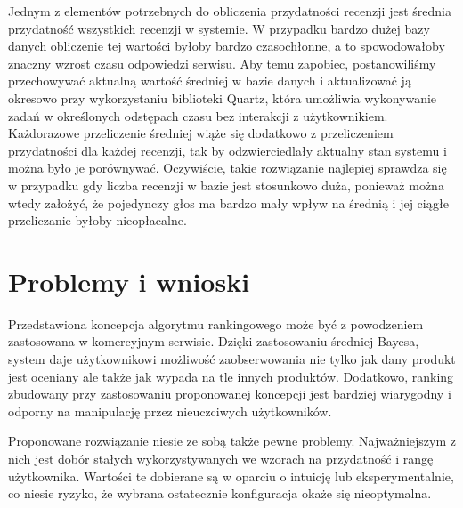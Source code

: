 Jednym z elementów potrzebnych do obliczenia przydatności recenzji jest średnia przydatność wszystkich recenzji w systemie. W przypadku bardzo dużej bazy danych obliczenie tej wartości byłoby bardzo czasochłonne, a to spowodowałoby znaczny wzrost czasu odpowiedzi serwisu. Aby temu zapobiec, postanowiliśmy przechowywać aktualną wartość średniej w bazie danych i aktualizować ją okresowo przy wykorzystaniu biblioteki Quartz, która umożliwia wykonywanie zadań w określonych odstępach czasu bez interakcji z użytkownikiem.\cite{quartz} Każdorazowe przeliczenie średniej wiąże się dodatkowo z przeliczeniem przydatności dla każdej recenzji, tak by odzwierciedlały aktualny stan systemu i można było je porównywać. Oczywiście, takie rozwiązanie najlepiej sprawdza się w przypadku gdy liczba  recenzji w bazie jest stosunkowo duża, ponieważ można wtedy założyć, że pojedynczy głos ma bardzo mały wpływ na średnią i jej ciągłe przeliczanie byłoby nieopłacalne.

\section{Problemy i wnioski}

Przedstawiona koncepcja algorytmu rankingowego może być z powodzeniem zastosowana w komercyjnym serwisie. Dzięki zastosowaniu średniej Bayesa, system daje użytkownikowi możliwość zaobserwowania nie tylko jak dany produkt jest oceniany ale także jak wypada na tle innych produktów. Dodatkowo, ranking zbudowany przy zastosowaniu proponowanej koncepcji jest bardziej wiarygodny i odporny na manipulację przez nieuczciwych użytkowników.

Proponowane rozwiązanie niesie ze sobą także pewne problemy. Najważniejszym z nich jest dobór stałych wykorzystywanych we wzorach na przydatność i rangę użytkownika. Wartości te dobierane są w oparciu o intuicję lub eksperymentalnie, co niesie ryzyko, że wybrana ostatecznie konfiguracja okaże się nieoptymalna.
